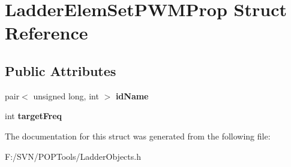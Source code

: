 \hypertarget{struct_ladder_elem_set_p_w_m_prop}{\section{Ladder\-Elem\-Set\-P\-W\-M\-Prop Struct Reference}
\label{struct_ladder_elem_set_p_w_m_prop}
}
\subsection*{Public Attributes}
\begin{DoxyCompactItemize}
\item 
\hypertarget{struct_ladder_elem_set_p_w_m_prop_a1c55f95240f3796813aad1c55c273b40}{pair$<$ unsigned long, int $>$ {\bfseries id\-Name}}\label{struct_ladder_elem_set_p_w_m_prop_a1c55f95240f3796813aad1c55c273b40}

\item 
\hypertarget{struct_ladder_elem_set_p_w_m_prop_a4a16481699c58bef0a0a2db1a614eed4}{int {\bfseries target\-Freq}}\label{struct_ladder_elem_set_p_w_m_prop_a4a16481699c58bef0a0a2db1a614eed4}

\end{DoxyCompactItemize}


The documentation for this struct was generated from the following file\-:\begin{DoxyCompactItemize}
\item 
F\-:/\-S\-V\-N/\-P\-O\-P\-Tools/Ladder\-Objects.\-h\end{DoxyCompactItemize}
